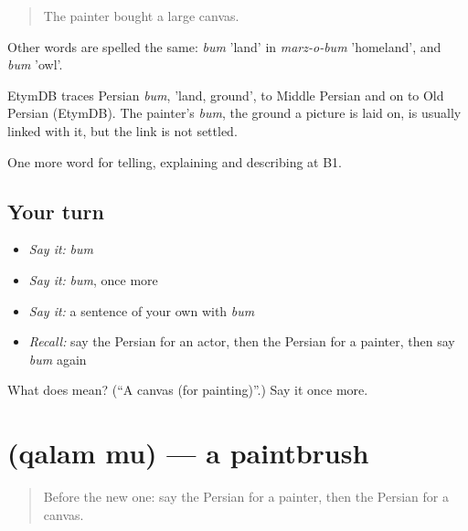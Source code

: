 \begin{quote}
The painter bought a large canvas.
\end{quote}

Other words are spelled the same: \emph{bum} 'land' in \emph{marz-o-bum} 'homeland', and \emph{bum} 'owl'.

\begin{cousinweb}
EtymDB traces Persian \emph{bum}, 'land, ground', to Middle Persian and on to Old Persian (EtymDB). The painter's \emph{bum}, the ground a picture is laid on, is usually linked with it, but the link is not settled.
\end{cousinweb}

\begin{grammarlens}[title={What you've built}]
One more word for telling, explaining and describing at B1.
\end{grammarlens}

\subsection*{Your turn}
\begin{itemize}
\raggedright
  \item \emph{Say it:} \emph{bum}
  \item \emph{Say it:} \emph{bum}, once more
  \item \emph{Say it:} a sentence of your own with \emph{bum}
  \item \emph{Recall:} say the Persian for an actor, then the Persian for a painter, then say \emph{bum} again
\end{itemize}

\begin{tcolorbox}[breakable,colback=teal!4,colframe=teal!35!black,title={Before you move on}]
What does  mean? (\textquotedblleft{}A canvas (for painting)\textquotedblright{}.) Say it once more.
\end{tcolorbox}
\section[\texorpdfstring{\fa{قلم} \fa{مو} (qalam mu)}{قلم مو (qalam mu)}]{  (qalam mu) — a paintbrush}

\label{lesson:FA-C525-qalam-mu}



\begin{quote}
Before the new one: say the Persian for a painter, then the Persian for a canvas.
\end{quote}

